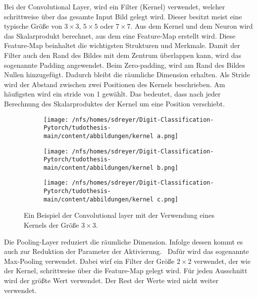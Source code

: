 Bei der Convolutional Layer, wird ein Filter (Kernel) verwendet, welcher schrittweise über das gesamte Input Bild gelegt wird.
Dieser besitzt meist eine typische Größe von $3 \times 3$, $5 \times 5$ oder $ 7 \times 7$.  
Aus dem Kernel und dem Neuron wird das Skalarprodukt berechnet, aus dem eine Feature-Map erstellt wird. 
Diese Feature-Map beinhaltet die wichtigsten Strukturen und Merkmale.
Damit der Filter auch den Rand des Bildes mit dem Zentrum überlappen kann, wird das sogenannte Padding angewendet.
Beim Zero-padding, wird am Rand des Bildes Nullen hinzugefügt. Dadurch bleibt die räumliche Dimension erhalten.
Als Stride wird der Abstand zwischen zwei Positionen des Kernels beschrieben. Am häufigsten wird ein stride von 1 gewählt. 
Das bedeutet, dass nach jeder Berechnung des Skalarproduktes der Kernel um eine Position verschiebt.
\begin{figure}[htbp]
  \centering
  \begin{subfigure}[b]{0.3\textwidth}
    \texttt{[image: /nfs/homes/sdreyer/Digit-Classification-Pytorch/tudothesis-main/content/abbildungen/kernel a.png]}
    \label{}
  \end{subfigure}
  \hfill
  \begin{subfigure}[b]{0.3\textwidth}
    \texttt{[image: /nfs/homes/sdreyer/Digit-Classification-Pytorch/tudothesis-main/content/abbildungen/kernel b.png]}
    \label{}
  \end{subfigure}
  \hfill
  \begin{subfigure}[b]{0.3\textwidth}
    \texttt{[image: /nfs/homes/sdreyer/Digit-Classification-Pytorch/tudothesis-main/content/abbildungen/kernel c.png]}
    \label{}
  \end{subfigure}
  \caption{Ein Beispiel der Convolutional layer mit der Verwendung eines Kernels der Größe $3 \times 3$.~\cite{Yamashita2018}}
  \label{fig:kernel}
\end{figure}

Die Pooling-Layer reduziert die räumliche Dimension. Infolge dessen kommt es auch zur Reduktion der Parameter der Aktivierung.~\cite{datascience}
Dafür wird das sogenannte Max-Pooling verwendet. Dabei wirf ein Filter der Größe $2 \times 2$ verwendet, der wie der Kernel, schrittweise über die Feature-Map gelegt wird.
Für jeden Ausschnitt wird der größte Wert verwendet. Der Rest der Werte wird nicht weiter verwendet.~\cite{Yamashita2018}\\

